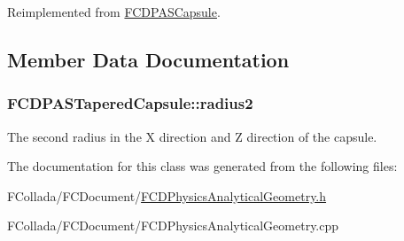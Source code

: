 Reimplemented from \hyperlink{classFCDPASCapsule_ad857a4a8159f4928d7260ed38fc46c22}{FCDPASCapsule}.



\subsection{Member Data Documentation}
\hypertarget{classFCDPASTaperedCapsule_a34e3bbbe3c80a574b69bb4e9e9a80016}{
\subsubsection[{radius2}]{ {\bf FCDPASTaperedCapsule::radius2}}}
\label{classFCDPASTaperedCapsule_a34e3bbbe3c80a574b69bb4e9e9a80016}
The second radius in the X direction and Z direction of the capsule. 

The documentation for this class was generated from the following files:\begin{DoxyCompactItemize}
\item 
FCollada/FCDocument/\hyperlink{FCDPhysicsAnalyticalGeometry_8h}{FCDPhysicsAnalyticalGeometry.h}\item 
FCollada/FCDocument/FCDPhysicsAnalyticalGeometry.cpp\end{DoxyCompactItemize}

